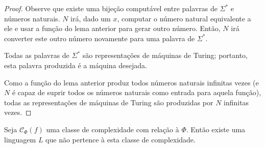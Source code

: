 \begin{proof}
    Observe que existe uma bijeção computável
    entre palavras de $\Sigma^*$
    e números naturais.
    $N$ irá,
    dado um $x$,
    computar o número natural equivalente a ele
    e usar a função do lema anterior
    para gerar outro número.
    Então, $N$ irá converter este outro número
    novamente para uma palavra de $\Sigma^*$.

    Todas as palavras de $\Sigma^*$
    são representações de máquinas de Turing;
    portanto, esta palavra produzida é a máquina desejada.

    Como a função do lema anterior
    produz todos números naturais infinitas vezes
    (e $N$ é capaz de suprir todos os números naturais
    como entrada para aquela função),
    todas as representações de máquinas de Turing
    são produzidas por $N$ infinitas vezes.
\end{proof}

\begin{theorem}
    Seja $\mathcal C_\Phi(f)$ uma classe de complexidade
    com relação à $\Phi$.
    Então existe uma linguagem $L$
    que não pertence à esta classe de complexidade.
\end{theorem}

